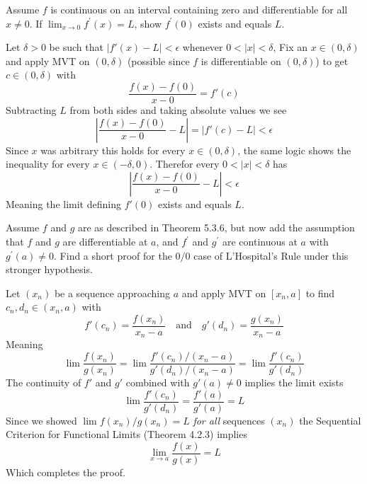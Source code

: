 \begin{exercise}
  Assume $f$ is continuous on an interval containing zero and differentiable for all $x \neq 0$. If $\lim _{x \rightarrow 0} f^{\prime}(x)=L$, show $f^{\prime}(0)$ exists and equals $L$.
\end{exercise}
\begin{solution}
  Let $\delta > 0$ be such that $|f'(x) - L| < \epsilon$ whenever $0<|x|<\delta$,
  Fix an $x \in (0,\delta)$ and apply MVT on $(0,\delta)$ (possible since $f$ is differentiable on $(0,\delta)$) to get $c \in (0,\delta)$ with
  $$
  \frac{f(x) - f(0)}{x - 0} = f'(c)
  $$
  Subtracting $L$ from both sides and taking absolute values we see
  $$
  \left|\frac{f(x) - f(0)}{x - 0} - L\right| = \left|f'(c) - L\right| < \epsilon
  $$
  Since $x$ was arbitrary this holds for every $x \in (0,\delta)$, the same logic shows the inequality for every $x \in (-\delta,0)$. Therefor every $0 < |x| < \delta$ has
  $$
  \left|\frac{f(x) - f(0)}{x - 0} - L\right| < \epsilon
  $$
  Meaning the limit defining $f'(0)$ exists and equals $L$.
\end{solution}

\begin{exercise}
  Assume $f$ and $g$ are as described in Theorem 5.3.6, but now add the assumption that $f$ and $g$ are differentiable at $a$, and $f^{\prime}$ and $g^{\prime}$ are continuous at $a$ with $g^{\prime}(a) \neq 0$. Find a short proof for the $0 / 0$ case of L'Hospital's Rule under this stronger hypothesis.
\end{exercise}
\begin{solution}
  Let $(x_n)$ be a sequence approaching $a$ and apply MVT on $[x_n,a]$ to find $c_n,d_n \in (x_n,a)$ with
  $$
  f'(c_n) = \frac{f(x_n)}{x_n - a} \quad\text{and}\quad g'(d_n) = \frac{g(x_n)}{x_n - a}
  $$
  Meaning
  $$
  \lim \frac{f(x_n)}{g(x_n)} = \lim \frac{f'(c_n)/(x_n-a)}{g'(d_n)/(x_n-a)} = \lim \frac{f'(c_n)}{g'(d_n)}
  $$
  The continuity of $f'$ and $g'$ combined with $g'(a) \ne 0$ implies the limit exists
  $$
  \lim \frac{f'(c_n)}{g'(d_n)} = \frac{f'(a)}{g'(a)} = L
  $$
  Since we showed $\lim f(x_n)/g(x_n) = L$ \emph{for all} sequences $(x_n)$ the Sequential Criterion for Functional Limits (Theorem 4.2.3) implies
  $$
  \lim_{x \to a} \frac{f(x)}{g(x)} = L
  $$
  Which completes the proof.
\end{solution}

